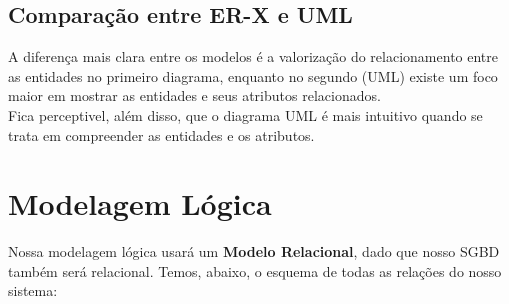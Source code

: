 \documentclass{article}
\begin{document}
	\subsection{Comparação entre ER-X e UML}
	A diferença mais clara entre os modelos é a valorização do relacionamento entre as entidades no primeiro diagrama, enquanto no segundo (UML) existe um foco maior em mostrar as entidades e seus atributos relacionados.\\
	Fica perceptivel, além disso, que o diagrama UML é mais intuitivo quando se trata em compreender as entidades e os atributos.

\section{Modelagem Lógica}
	Nossa modelagem lógica usará um \textbf{Modelo Relacional}, dado que nosso SGBD também será relacional. Temos, abaixo, o esquema de todas as relações do nosso sistema:\\
\end{document}
